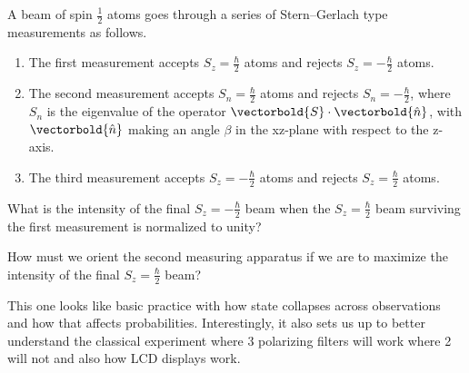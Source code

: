 \begin{question}

A beam of spin $\frac 1 2$ atoms goes through a series of
Stern–Gerlach type measurements as follows.

\begin{enumerate}[label=\alph*.]

\item The first measurement accepts $S_z = \frac{\hbar}{2}$ atoms and
  rejects $S_z = -\frac{\hbar}{2}$ atoms.

\item The second measurement accepts $S_n = \frac{\hbar}{2}$ atoms and
  rejects $S_n = -\frac{\hbar}{2}$, where $S_n$ is the eigenvalue of
  the operator $\vectorbold{S} \cdot \vectorbold{\hat{n}}$, with
  $\vectorbold{\hat{n}}$ making an angle $\beta$ in the xz-plane with
  respect to the z-axis.

\item The third measurement accepts $S_z = -\frac{\hbar}{2}$ atoms and
  rejects $S_z = \frac{\hbar}{2}$ atoms.

\end{enumerate}

\begin{questionpart}
  What is the intensity of the final $S_z = -\frac{\hbar}{2}$ beam
  when the $S_z = \frac{\hbar}{2}$ beam surviving the first
  measurement is normalized to unity?
\end{questionpart}

\begin{questionpart}
 How must we orient the second measuring apparatus if we are to
 maximize the intensity of the final $S_z = \frac{\hbar}{2}$ beam?
\end{questionpart}

\end{question}

\begin{purpose}
  This one looks like basic practice with how state collapses across
  observations and how that affects probabilities.  Interestingly, it
  also sets us up to better understand the classical experiment where
  3 polarizing filters will work where 2 will not and also how LCD
  displays work.
\end{purpose}

